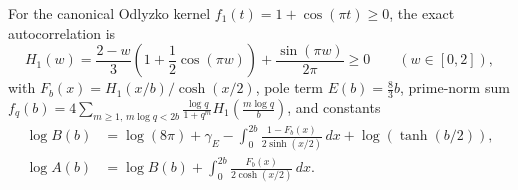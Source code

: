 \documentclass[11pt]{amsart}
\numberwithin{equation}{section}
\theoremstyle{plain}
\theoremstyle{definition}\newtheorem{definition}[theorem]{Definition}
\theoremstyle{remark}\newtheorem{remark}[theorem]{Remark}
\begin{document}
For the canonical Odlyzko kernel $f_1(t) = 1+\cos(\pi t) \ge 0$, the exact autocorrelation is
\begin{equation}\label{eq:H1}
H_1(w) = \frac{2-w}{3}\!\left(1 + \frac{1}{2}\cos(\pi w)\right) + \frac{\sin(\pi w)}{2\pi} \ge 0 \qquad (w\in[0,2]),
\end{equation}
with $F_b(x) = H_1(x/b)/\cosh(x/2)$, pole term $E(b) = \frac{8}{3}b$, prime-norm sum $f_q(b) = 4\sum_{m\ge 1,\, m\log q < 2b} \frac{\log q}{1+q^m} H_1(\frac{m\log q}{b})$, and constants
\begin{equation}\label{eq:odlyzko_AB}
\begin{aligned}\log B(b) &= \log(8\pi) + \gamma_E - \int_0^{2b} \frac{1-F_b(x)}{2\sinh(x/2)}\,dx + \log(\tanh(b/2)),\\ \log A(b) &= \log B(b) + \int_0^{2b} \frac{F_b(x)}{2\cosh(x/2)}\,dx.\end{aligned}
\end{equation}
\end{document}
